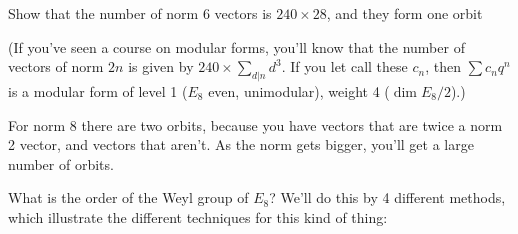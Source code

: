  \begin{exercise}
   Show that the number of norm 6 vectors is $240\times 28$, and they form one orbit
 \end{exercise}
(If you've seen a course on modular forms, you'll know that the number of vectors of
norm
 $2n$ is given by $240\times \sum_{d|n} d^3$. If you let call these $c_n$, then
 $\sum c_n q^n$ is a modular form of level 1 ($E_8$ even, unimodular), weight 4 ($\dim
 E_8/2$).)

 For norm $8$ there are two orbits, because you have vectors that are twice a norm 2
 vector, and vectors that aren't.  As the norm gets bigger, you'll get a large number
 of orbits.

 What is the order of the Weyl group of $E_8$? We'll do this by 4 different methods,
 which illustrate the different techniques for this kind of thing:
